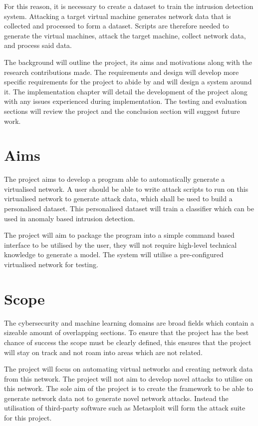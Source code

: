 For this reason, it is necessary to create a dataset to train the intrusion detection system. Attacking a target virtual machine generates network data that is collected and processed to form a dataset. Scripts are therefore needed to generate the virtual machines, attack the target machine, collect network data, and process said data.

The background will outline the project, its aims and motivations along with the research contributions made. The requirements and design will develop more specific requirements for the project to abide by and will design a system around it. The implementation chapter will detail the development of the project along with any issues experienced during implementation. The testing and evaluation sections will review the project and the conclusion section will suggest future work.

\section{Aims}
The project aims to develop a program able to automatically generate a virtualised network. A user should be able to write attack scripts to run on this virtualised network to generate attack data, which shall be used to build a personalised dataset. This personalised dataset will train a classifier which can be used in anomaly based intrusion detection.

The project will aim to package the program into a simple command based interface to be utilised by the user, they will not require high-level technical knowledge to generate a model. The system will utilise a pre-configured virtualised network for testing.

\section{Scope}
The cybersecurity and machine learning domains are broad fields which contain a sizeable amount of overlapping sections. To ensure that the project has the best chance of success the scope must be clearly defined, this ensures that the project will stay on track and not roam into areas which are not related. 

The project will focus on automating virtual networks and creating network data from this network. The project will not aim to develop novel attacks to utilise on this network. The sole aim of the project is to create the framework to be able to generate network data not to generate novel network attacks. Instead the utilisation of third-party software such as Metasploit will form the attack suite for this project.

